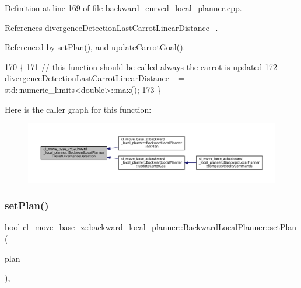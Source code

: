 Definition at line 169 of file backward\+\_\+curved\+\_\+local\+\_\+planner.\+cpp.



References divergence\+Detection\+Last\+Carrot\+Linear\+Distance\+\_\+.



Referenced by set\+Plan(), and update\+Carrot\+Goal().


\begin{DoxyCode}
170         \{
171             \textcolor{comment}{// this function should be called always the carrot is updated}
172             \hyperlink{classcl__move__base__z_1_1backward__local__planner_1_1BackwardLocalPlanner_a3187b3b0c9a640133556efd056f2e736}{divergenceDetectionLastCarrotLinearDistance\_} = 
      std::numeric\_limits<double>::max();
173         \}
\end{DoxyCode}
Here is the caller graph for this function\+:
\nopagebreak
\begin{figure}[H]
\begin{center}
\leavevmode
\includegraphics[width=350pt]{classcl__move__base__z_1_1backward__local__planner_1_1BackwardLocalPlanner_a35832ebefc43e5977e1222389244c8d3_icgraph}
\end{center}
\end{figure}
\mbox{\label{classcl__move__base__z_1_1backward__local__planner_1_1BackwardLocalPlanner_ab11a0eec45f24b5a5a3987a50427eed4}} 
\subsubsection{\texorpdfstring{set\+Plan()}{setPlan()}}
{\footnotesize\ttfamily \hyperlink{classbool}{bool} cl\+\_\+move\+\_\+base\+\_\+z\+::backward\+\_\+local\+\_\+planner\+::\+Backward\+Local\+Planner\+::set\+Plan (\begin{DoxyParamCaption}\item[{const std\+::vector$<$ geometry\+\_\+msgs\+::\+Pose\+Stamped $>$ \&}]{plan }\end{DoxyParamCaption})\hspace{0.3cm}{\ttfamily [override]}, {\ttfamily [virtual]}}



